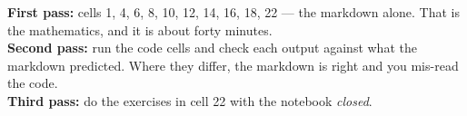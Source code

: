 \begin{warnbox}[title={Read in this order}]
\textbf{First pass:} cells 1, 4, 6, 8, 10, 12, 14, 16, 18, 22 --- the markdown alone. That is the
mathematics, and it is about forty minutes.\\[4pt]
\textbf{Second pass:} run the code cells and check each output against what the markdown predicted.
Where they differ, the markdown is right and you mis-read the code.\\[4pt]
\textbf{Third pass:} do the exercises in cell 22 with the notebook \emph{closed}.
\end{warnbox}
